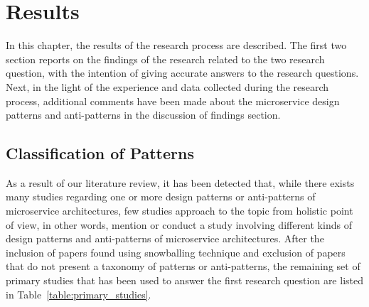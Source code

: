 \documentclass{Configuration_Files/PoliMi3i_thesis}
\begin{document}
\chapter{Results}
\label{ch:results}%

In this chapter, the results of the research process are described.
The first two section reports on the findings of the research related to the two research question, with the intention of giving accurate answers to the research questions.
Next, in the light of the experience and data collected during the research process, additional comments have been made about the microservice design patterns and anti-patterns in the discussion of findings section.

\section{Classification of Patterns}
\label{subsec:classification_result}

As a result of our literature review, it has been detected that, while there exists many studies regarding one or more design patterns or anti-patterns of microservice architectures, few studies approach to the topic from holistic point of view, in other words, mention or conduct a study involving different kinds of design patterns and anti-patterns of microservice architectures.
After the inclusion of papers found using snowballing technique and exclusion of papers that do not present a taxonomy of patterns or anti-patterns, the remaining set of primary studies that has been used to answer the first research question are listed in Table~\ref{table:primary_studies}. 
\end{document}
